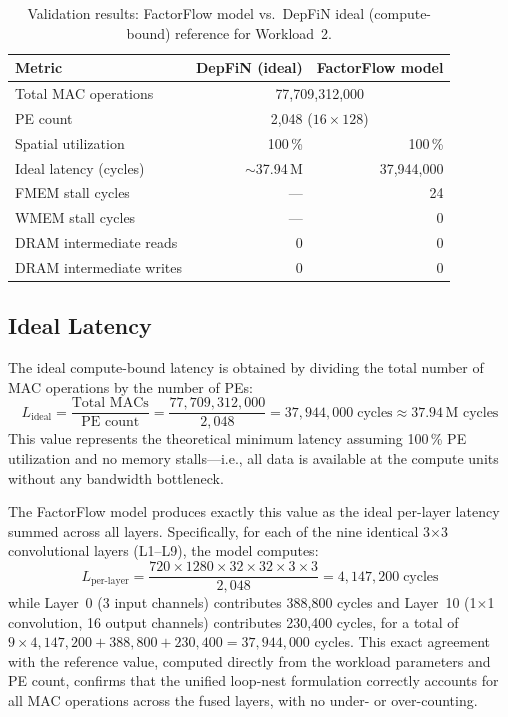 \begin{table}[htbp]
  \centering
  \caption{Validation results: FactorFlow model vs.\ DepFiN ideal
           (compute-bound) reference for Workload~2.}
  \label{tab:val-results}
  \small
  \begin{tabular}{l r r}
    \toprule
    \textbf{Metric}
      & \textbf{DepFiN (ideal)}
      & \textbf{FactorFlow model} \\
    \midrule
    Total MAC operations
      & \multicolumn{2}{c}{77,709,312,000} \\
    PE count
      & \multicolumn{2}{c}{2,048 ($16 \times 128$)} \\
    Spatial utilization
      & 100\,\%
      & 100\,\% \\
    \addlinespace
    Ideal latency (cycles)
      & $\sim$37.94\,M
      & 37,944,000 \\
    \addlinespace
    FMEM stall cycles
      & ---
      & 24 \\
    WMEM stall cycles
      & ---
      & 0 \\
    \addlinespace
    DRAM intermediate reads
      & 0
      & 0 \\
    DRAM intermediate writes
      & 0
      & 0 \\
    \bottomrule
  \end{tabular}
\end{table}


\subsection{Ideal Latency}
\label{sec:val-ideal-latency}

The ideal compute-bound latency is obtained by dividing the total
number of MAC operations by the number of PEs:
%
\begin{equation}
  \label{eq:ideal-latency}
  L_{\text{ideal}} = \frac{\text{Total MACs}}{\text{PE count}}
  = \frac{77{,}709{,}312{,}000}{2{,}048}
  = 37{,}944{,}000 \;\text{cycles}
  \approx 37.94\,\text{M cycles}
\end{equation}
%
This value represents the theoretical minimum latency assuming
100\,\% PE utilization and no memory stalls---i.e., all data is
available at the compute units without any bandwidth bottleneck.

The FactorFlow model produces exactly this value as the ideal
per-layer latency summed across all layers.
Specifically, for each of the nine identical 3$\times$3 convolutional
layers (L1--L9), the model computes:
%
\begin{equation}
  L_{\text{per-layer}} = \frac{720 \times 1280 \times 32 \times 32 \times 3 \times 3}{2{,}048}
  = 4{,}147{,}200 \;\text{cycles}
\end{equation}
%
while Layer~0 (3 input channels) contributes 388,800 cycles and
Layer~10 (1$\times$1 convolution, 16 output channels) contributes
230,400 cycles, for a total of $9 \times 4{,}147{,}200 + 388{,}800 +
230{,}400 = 37{,}944{,}000$ cycles.
This exact agreement with the reference value, computed directly from
the workload parameters and PE count, confirms that the unified
loop-nest formulation correctly accounts for all MAC operations across
the fused layers, with no under- or over-counting.


